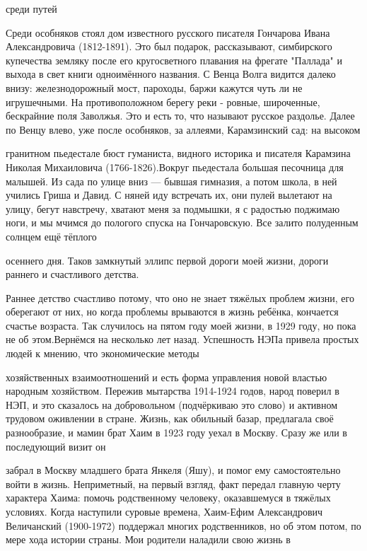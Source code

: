 \label{136-1}
среди путей

Среди особняков стоял дом известного русского писателя Гончарова Ивана Александровича (1812-1891). Это был подарок, рассказывают, симбирского купечества земляку после его кругосветного плавания на фрегате "Паллада" и выхода в свет книги одноимённого названия. С Венца Волга видится далеко внизу: железнодорожный мост, пароходы, баржи кажутся чуть ли не игрушечными. На противоположном берегу реки - ровные, широченные, бескрайние поля Заволжья. Это и есть то, что называют русское раздолье. Далее по Венцу влево, уже после особняков, за аллеями, Карамзинский сад: на высоком 

\label{137-1}
гранитном пьедестале бюст гуманиста, видного историка и писателя Карамзина Николая Михаиловича (1766-1826).Вокруг пьедестала большая песочница для малышей. Из сада по улице вниз — бывшая гимназия, а потом школа, в ней учились Гриша и Давид. С няней иду встречать их, они пулей вылетают на улицу, бегут навстречу, хватают меня за подмышки, я с радостью поджимаю ноги, и мы мчимся до пологого спуска на Гончаровскую. Все  залито полуденным солнцем ещё тёплого 

\label{138-1}
осеннего дня. Таков замкнутый эллипс первой дороги моей жизни, дороги раннего и счастливого детства. 

Раннее детство счастливо потому, что оно не знает тяжёлых проблем жизни, его оберегают от них, но когда проблемы врываются в жизнь ребёнка, кончается счастье возраста. Так случилось на пятом году моей жизни, в 1929 году, но пока не об этом.Вернёмся на несколько лет назад. Успешность НЭПа привела простых людей к мнению, что экономические методы

\label{139-1}
хозяйственных взаимоотношений и есть форма управления новой властью народным хозяйством. Пережив мытарства 1914-1924 годов, народ поверил в НЭП, и это сказалось на добровольном (подчёркиваю это слово) и активном трудовом оживлении в стране. Жизнь, как обильный базар, предлагала своё разнообразие, и мамин брат Хаим в 1923 году уехал в Москву. Сразу же или в последующий визит он 

\label{140-1}
забрал в Москву младшего брата Янкеля (Яшу), и помог ему самостоятельно войти в жизнь. Неприметный, на первый взгляд, факт передал главную черту характера Хаима: помочь родственному человеку, оказавшемуся в тяжёлых условиях. Когда наступили суровые времена, Хаим-Ефим Александрович Величанский (1900-1972) поддержал многих родственников, но об этом потом, по мере хода истории страны. Мои родители наладили свою жизнь в

